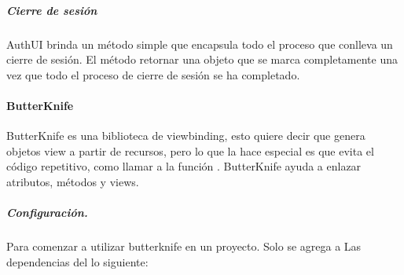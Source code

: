 \subparagraph{Cierre de sesión}
\label{\detokenize{dev_docs:cierre-de-sesion}}
AuthUI brinda un método  simple que encapsula todo el proceso
que conlleva un cierre de sesión. El método retornar una objeto 
que se marca completamente una vez que todo el proceso de cierre de sesión
se ha completado.

%
\begin{sphinxVerbatim}[commandchars=\\\{\}]
  
              
                     
                      
                      
\end{sphinxVerbatim}


\paragraph{ButterKnife}
\label{\detokenize{dev_docs:butterknife}}
ButterKnife es una biblioteca de viewbinding, esto quiere decir que genera
objetos view a partir de recursos, pero lo que la hace especial es que evita
el código repetitivo, como llamar a la función . ButterKnife
ayuda a enlazar atributos, métodos y views.


\subparagraph{Configuración.}
\label{\detokenize{dev_docs:id1}}
Para comenzar a utilizar butterknife en un proyecto. Solo se agrega a Las
dependencias del  lo siguiente:

